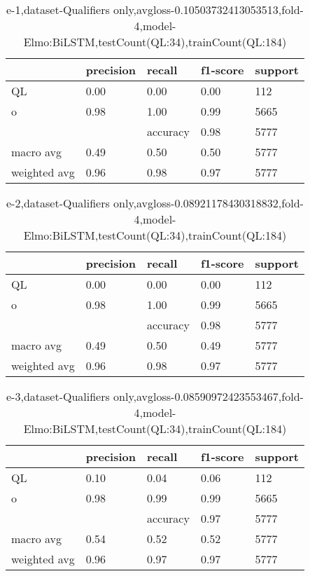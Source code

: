 \begin{table}[!ht] 
\centering
\caption{e-1,dataset-Qualifiers only,avgloss-0.10503732413053513,fold-4,model-Elmo:BiLSTM,testCount(QL:34),trainCount(QL:184)}\label{e-1data-qualS.tsv}
\begin{tabularx}{300pt}{|X|X|X|X|X|}
\hline
&precision&recall&f1-score&support\\
\hline
QL&0.00&0.00&0.00&112\\
\hline
o&0.98&1.00&0.99&5665\\
\hline
&&accuracy&0.98&5777\\
\hline
macro avg&0.49&0.50&0.50&5777\\
\hline
weighted avg&0.96&0.98&0.97&5777\\
\hline
\end{tabularx}
\end{table}
\begin{table}[!ht] 
\centering
\caption{e-2,dataset-Qualifiers only,avgloss-0.08921178430318832,fold-4,model-Elmo:BiLSTM,testCount(QL:34),trainCount(QL:184)}\label{e-2data-qualS.tsv}
\begin{tabularx}{300pt}{|X|X|X|X|X|}
\hline
&precision&recall&f1-score&support\\
\hline
QL&0.00&0.00&0.00&112\\
\hline
o&0.98&1.00&0.99&5665\\
\hline
&&accuracy&0.98&5777\\
\hline
macro avg&0.49&0.50&0.49&5777\\
\hline
weighted avg&0.96&0.98&0.97&5777\\
\hline
\end{tabularx}
\end{table}
\begin{table}[!ht] 
\centering
\caption{e-3,dataset-Qualifiers only,avgloss-0.08590972423553467,fold-4,model-Elmo:BiLSTM,testCount(QL:34),trainCount(QL:184)}\label{e-3data-qualS.tsv}
\begin{tabularx}{300pt}{|X|X|X|X|X|}
\hline
&precision&recall&f1-score&support\\
\hline
QL&0.10&0.04&0.06&112\\
\hline
o&0.98&0.99&0.99&5665\\
\hline
&&accuracy&0.97&5777\\
\hline
macro avg&0.54&0.52&0.52&5777\\
\hline
weighted avg&0.96&0.97&0.97&5777\\
\hline
\end{tabularx}
\end{table}
